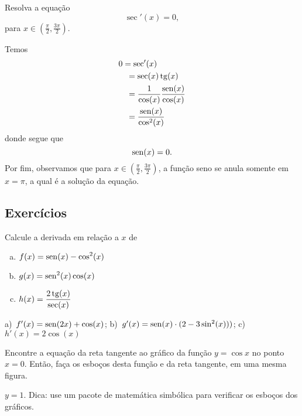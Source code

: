 \begin{exeresol}
  Resolva a equação
  \begin{equation}
    \sec'(x) = 0,
  \end{equation}
  para $x\in \left(\frac{\pi}{2}, \frac{3\pi}{2}\right)$.
\end{exeresol}
\begin{resol}
  Temos
  \begin{align}
    & 0 = \sec'(x) \\
    & \text{}\quad = \sec(x)\operatorname{tg}(x) \\
    & \text{}\quad = \frac{1}{\cos(x)}\frac{\operatorname{sen}(x)}{\cos(x)} \\
    & \text{}\quad = \frac{\operatorname{sen}(x)}{\cos^2(x)}
  \end{align}
  donde segue que
  \begin{equation}
    \operatorname{sen}(x) = 0.
  \end{equation}
  Por fim, observamos que para $x\in \left(\frac{\pi}{2}, \frac{3\pi}{2}\right)$, a função seno se anula somente em $x=\pi$, a qual é a solução da equação.
\end{resol}


\subsection{Exercícios}

\begin{exer}
  Calcule a derivada em relação a $x$ de
  \begin{enumerate}[a)]
  \item $\displaystyle f(x)=\operatorname{sen}(x)-\cos^2(x)$
  \item $\displaystyle g(x)=\operatorname{sen}^2(x)\cos(x)$
  \item $\displaystyle h(x)=\frac{2\operatorname{tg}(x)}{\sec(x)}$
  \end{enumerate}
\end{exer}
\begin{resp}
  a)~$f'(x)=\operatorname{sen}(2x)+\cos(x)$; b)~$g'(x)=\operatorname{sen}(x)\cdot(2-3\sin^2(x)))$; c)~$h'(x)=2\cos(x)$
\end{resp}

\begin{exer}
  Encontre a equação da reta tangente ao gráfico da função $y = \cos x$ no ponto $x=0$. Então, faça os esboços desta função e da reta tangente, em uma mesma figura.  
\end{exer}
\begin{resp}
  $y = 1$. Dica: use um pacote de matemática simbólica para verificar os esboços dos gráficos.
\end{resp}

